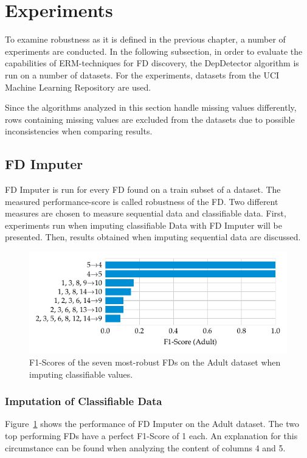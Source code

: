 \newpage
\section{Experiments}
To examine robustness as it is defined in the previous chapter, a number of experiments are conducted.
In the following subsection, in order to evaluate the capabilities of ERM-techniques for FD discovery, the DepDetector algorithm is run on a number of datasets.
For the experiments, datasets from the UCI Machine Learning Repository are used.~\cite{DUA19}

Since the algorithms analyzed in this section handle missing values differently, rows containing missing values are excluded from the datasets due to possible inconsistencies when comparing results.

\subsection{FD Imputer}
FD Imputer is run for every FD found on a train subset of a dataset.
The measured performance-score is called robustness of the FD.
Two different measures are chosen to measure sequential data and classifiable data.
First, experiments run when imputing classifiable Data with FD Imputer will be presented.
Then, results obtained when imputing sequential data are discussed.

\begin{figure}[ht]
     \centering
     \includegraphics[width=\textwidth]{../figures/adult/f1_fd_imputer.pdf}
     \caption{F1-Scores of the seven most-robust FDs on the Adult dataset when imputing classifiable values.}
     \label{fig:f1_fd_adult}
\end{figure}

\subsubsection{Imputation of Classifiable Data}
Figure~\ref{fig:f1_fd_adult} shows the performance of FD Imputer on the Adult dataset.
The two top performing FDs have a perfect F1-Score of 1 each.
An explanation for this circumstance can be found when analyzing the content of columns 4 and 5.

